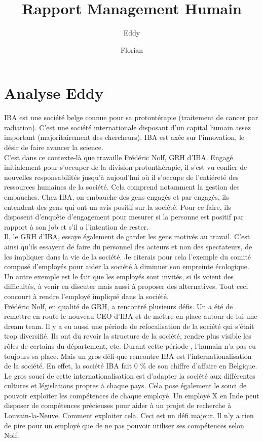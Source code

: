 \documentclass[12pt]{article}
\title{Rapport Management Humain}
\author{\bsc{Ndizera} Eddy \and \bsc{Thuin} Florian}
\begin{document}
\maketitle

\section{Analyse Eddy}

IBA est une société belge connue pour sa protontérapie (traitement de cancer par radiation). C'est une société internationale disposant d'un capital humain assez important (majoritairement des chercheurs). IBA est axée sur l'innovation, le désir de faire avancer la science.\\

C'est dans ce contexte-là que travaille Frédéric Nolf, GRH d'IBA. Engagé initialement pour s'occuper de la division protonthérapie, il s'est vu confier de nouvelles responsabilités jusqu'à aujoud'hui où il s'occupe de l'entiéreté des ressources humaines de la société. Cela comprend notamment la gestion des embauches. Chez IBA, on embauche des gens engagés et par engagés, ils entendent des gens qui ont un avis positif sur la société. Pour ce faire, ils disposent d'enquête d'engagement pour mesurer si la personne est positif par rapport à son job et s'il a l'intention de rester.\\

Il, le GRH d'IBA, essaye également de garder les gens motivés au travail. C'est ainsi qu'ils essayent de faire du personnel des acteurs et non des spectateurs, de les impliquer dans la vie de la société. Je citerais pour cela l'exemple du comité composé d'employés pour  aider la société à diminuer son empreinte écologique. Un autre exemple est le fait que les employés sont invités, si ils voient des difficultés, à venir en discuter mais aussi à proposer des alternatives. Tout ceci concourt à rendre l'employé impliqué dans la société. \\

Frédéric Nolf, en qualité de GRH, a rencontré plusieurs défis. Un a été de remettre en route le nouveau CEO d'IBA et de mettre en place autour de lui une dream team. Il y a eu aussi une période de refocalisation de la société qui s'était trop diversifié. Ils ont du revoir la structure de la société, rendre plus visible les rôles de certains du département, etc. Durant cette période , l'humain n'a pas eu toujours sa place. Mais un gros défi que rencontre IBA est l'internationalisation de la société. En effet, la société IBA fait 0 \% de son chiffre d'affaire en Belgique. Le gros souci de cette internationalisation est d'adapter la société aux différentes cultures et législations propres à chaque pays. Cela pose également le souci de pouvoir exploiter les compétences de chaque employé. Un employé X en Inde peut disposer de compétences précieuses pour aider à un projet de recherche à Louvain-la-Neuve. Comment exploiter cela. Ceci est un défi majeur. Il n'y a rien de pire pour un employé que de ne pas pouvoir utiliser ses compétences selon Nolf.\\
\end{document}
